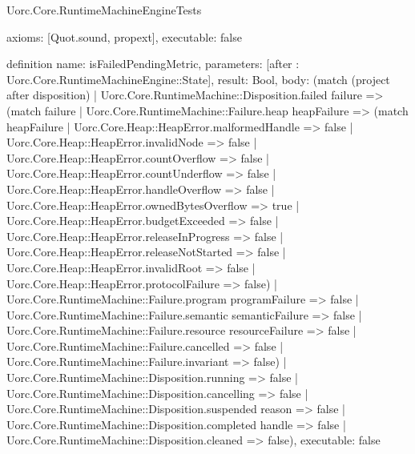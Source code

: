 \begin{lexlean}{Uorc.Core.RuntimeMachineEngineTests}
\begin{semanticmodule}
{  axioms: [Quot.sound, propext],
  executable: false
}

definition{
  name: isFailedPendingMetric,
  parameters: [after : Uorc.Core.RuntimeMachineEngine::State],
  result: Bool,
  body: (match (project after disposition)
    | Uorc.Core.RuntimeMachine::Disposition.failed failure => (match failure
      | Uorc.Core.RuntimeMachine::Failure.heap heapFailure => (match heapFailure
        | Uorc.Core.Heap::HeapError.malformedHandle => false
        | Uorc.Core.Heap::HeapError.invalidNode => false
        | Uorc.Core.Heap::HeapError.countOverflow => false
        | Uorc.Core.Heap::HeapError.countUnderflow => false
        | Uorc.Core.Heap::HeapError.handleOverflow => false
        | Uorc.Core.Heap::HeapError.ownedBytesOverflow => true
        | Uorc.Core.Heap::HeapError.budgetExceeded => false
        | Uorc.Core.Heap::HeapError.releaseInProgress => false
        | Uorc.Core.Heap::HeapError.releaseNotStarted => false
        | Uorc.Core.Heap::HeapError.invalidRoot => false
        | Uorc.Core.Heap::HeapError.protocolFailure => false)
      | Uorc.Core.RuntimeMachine::Failure.program programFailure => false
      | Uorc.Core.RuntimeMachine::Failure.semantic semanticFailure => false
      | Uorc.Core.RuntimeMachine::Failure.resource resourceFailure => false
      | Uorc.Core.RuntimeMachine::Failure.cancelled => false
      | Uorc.Core.RuntimeMachine::Failure.invariant => false)
    | Uorc.Core.RuntimeMachine::Disposition.running => false
    | Uorc.Core.RuntimeMachine::Disposition.cancelling => false
    | Uorc.Core.RuntimeMachine::Disposition.suspended reason => false
    | Uorc.Core.RuntimeMachine::Disposition.completed handle => false
    | Uorc.Core.RuntimeMachine::Disposition.cleaned => false),
  executable: false
}


\end{semanticmodule}
\end{lexlean}
